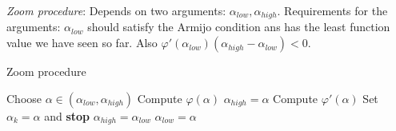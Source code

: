 \begin{definition} \textit{Zoom procedure}: 
Depends on two arguments: $\alpha_{low}, \alpha_{high}$. Requirements for the arguments: $\alpha_{low}$ should satisfy the Armijo condition ans has the least function value we have seen so far. Also $\varphi'(\alpha_{low})(\alpha_{high} - \alpha_{low}) < 0$.
\begin{algorithm}
  \caption{Zoom procedure}
  \begin{algorithmic}[1]
      \State Choose $\alpha \in (\alpha_{low}, \alpha_{high})$
      \State Compute $\varphi(\alpha)$
          \State $\alpha_{high} = \alpha$
      \EndIf
      \State Compute $\varphi'(\alpha)$
          \State Set $\alpha_k = \alpha$ and \textbf{stop}
      \EndIf
          \State $\alpha_{high} = \alpha_{low}$
      \EndIf
      \State $\alpha_{low} = \alpha$
  \EndWhile
\end{algorithmic}
\end{algorithm}
\end{definition}

\newpage